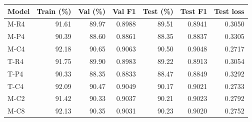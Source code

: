 \begin{tabular}{lrrrrrr}
\toprule
Model & Train (\%) & Val (\%) & Val F1 & Test (\%) & Test F1 & Test loss\\
\midrule
M-R4 & 91.61 & 89.97 & 0.8988 & 89.51 & 0.8941 & 0.3050\\
M-P4 & 90.39 & 88.60 & 0.8861 & 88.35 & 0.8837 & 0.3305\\
M-C4 & 92.18 & 90.65 & 0.9063 & 90.50 & 0.9048 & 0.2717\\
T-R4 & 91.75 & 89.90 & 0.8983 & 89.22 & 0.8913 & 0.3054\\
T-P4 & 90.33 & 88.35 & 0.8833 & 88.47 & 0.8849 & 0.3292\\
T-C4 & 92.09 & 90.47 & 0.9049 & 90.17 & 0.9021 & 0.2733\\
M-C2 & 91.42 & 90.33 & 0.9037 & 90.21 & 0.9023 & 0.2792\\
M-C8 & 92.13 & 90.35 & 0.9031 & 90.23 & 0.9020 & 0.2752\\
\bottomrule
\end{tabular}
